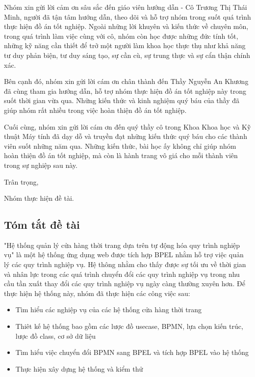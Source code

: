 \documentclass[a4paper, twoside, 12pt]{report}
\theoremstyle{definition}
\begin{document}
Nhóm xin gửi lời cảm ơn sâu sắc đến giáo viên hướng dẫn - Cô Trương Thị Thái Minh, người đã tận tâm hướng dẫn, theo dõi và hỗ trợ nhóm trong suốt quá trình thực hiện đồ án tốt nghiệp. Ngoài những lời khuyên và kiến thức về chuyên môn, trong quá trình làm việc cùng với cô, nhóm còn học được những đức tính tốt, những kỹ năng cần thiết để trở một người làm khoa học thực thụ như khả năng tư duy phản biện, tư duy sáng tạo, sự cần cù, sự trung thực và sự cẩn thận chính xác.

Bên cạnh đó, nhóm xin gửi lời cám ơn chân thành đến Thầy Nguyễn An Khương đã cùng tham gia hướng dẫn, hỗ trợ nhóm thực hiện đồ án tốt nghiệp này trong suốt thời gian vừa qua. Những kiến thức và kinh nghiệm quý báu của thầy đã giúp nhóm rất nhiều trong việc hoàn thiện đồ án tốt nghiệp.

Cuối cùng, nhóm xin gửi lời cám ơn đến quý thầy cô trong Khoa Khoa học và Kỹ thuật Máy tính đã dạy dỗ và truyền đạt những kiến thức quý báu cho các thành viên suốt những năm qua. Những kiến thức, bài học ấy không chỉ giúp nhóm hoàn thiện đồ án tốt nghiệp, mà còn là hành trang vô giá cho mỗi thành viên trong sự nghiệp sau này.

\hspace{10cm} Trân trọng,

\hspace{9cm} Nhóm thực hiện đề tài.

\newpage

\setlength{\parskip}{2.5mm}
\thispagestyle{plain}
\begin{center}
	\section*{Tóm tắt đề tài}
\end{center}

"Hệ thống quản lý cửa hàng thời trang dựa trên tự động hóa quy trình nghiệp vụ" là một hệ thống ứng dụng web được tích hợp BPEL nhằm hỗ trợ việc quản lý các quy trình nghiệp vụ. Hệ thông nhằm cho thấy được sự tối ưu về thời gian và nhân lực trong các quá trình chuyển đổi các quy trình nghiệp vụ trong nhu cầu tần xuất thay đổi các quy trình nghiệp vụ ngày càng thường xuyên hơn. Để thực hiện hệ thống này, nhóm đã thực hiện các công việc sau:
\begin{itemize}
	\item Tìm hiểu các nghiệp vụ của các hệ thống cửa hàng thời trang
	\item Thiêt kế hệ thống bao gồm các lược đồ usecase, BPMN, lựa chọn kiến trúc, lược đồ class, cơ sở dữ liệu
	\item Tìm hiểu việc chuyển đổi BPMN sang BPEL và tích hợp BPEL vào hệ thống
	\item Thực hiện xây dựng hệ thống và kiểm thử
\end{itemize}
\end{document}
